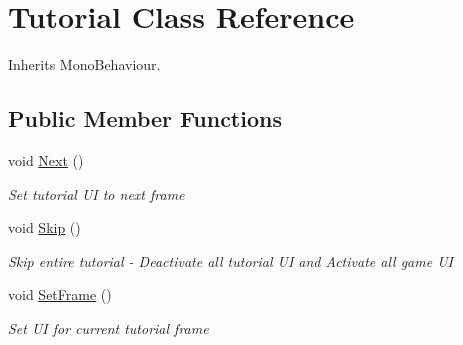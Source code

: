 \hypertarget{class_tutorial}{}\section{Tutorial Class Reference}
\label{class_tutorial}


Inherits Mono\+Behaviour.

\subsection*{Public Member Functions}
\begin{DoxyCompactItemize}
\item 
void \hyperlink{class_tutorial_ae267409a36a00493c581ddcdcdeec602}{Next} ()
\begin{DoxyCompactList}\small\item\em Set tutorial UI to next frame \end{DoxyCompactList}\item 
void \hyperlink{class_tutorial_abd05f39a37f6412a5b17ee89aafdaeeb}{Skip} ()
\begin{DoxyCompactList}\small\item\em Skip entire tutorial -\/ Deactivate all tutorial UI and Activate all game UI \end{DoxyCompactList}\item 
void \hyperlink{class_tutorial_ae1ddf7721e3e688834f2097e73e3d806}{Set\+Frame} ()
\begin{DoxyCompactList}\small\item\em Set UI for current tutorial frame \end{DoxyCompactList}\end{DoxyCompactItemize}
